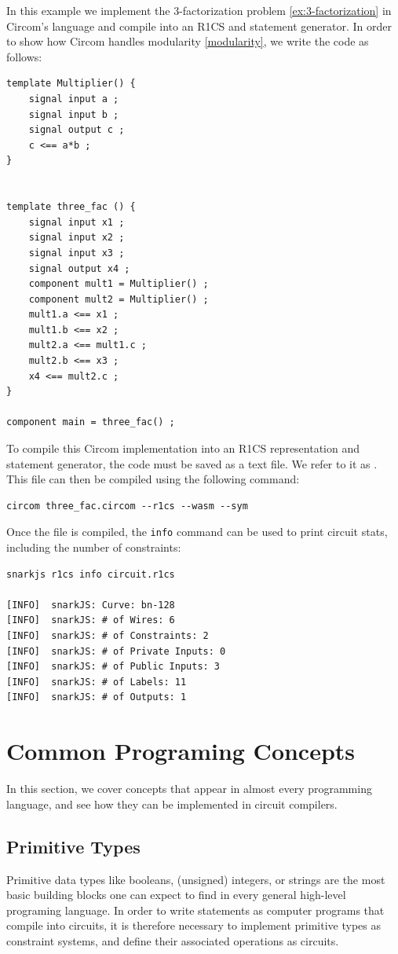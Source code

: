 \begin{example}
\label{ex:3-fac-circom}
In this example we implement the 3-factorization problem \ref{ex:3-factorization} in Circom's language and compile into an R1CS and statement generator. In order to show how Circom handles modularity \ref{modularity}, we write the code as follows:
\begin{lstlisting}
template Multiplier() {
    signal input a ;
    signal input b ;
    signal output c ;
    c <== a*b ;
}


template three_fac () {
    signal input x1 ;
    signal input x2 ;
    signal input x3 ;
    signal output x4 ;
    component mult1 = Multiplier() ;
    component mult2 = Multiplier() ;
    mult1.a <== x1 ;
    mult1.b <== x2 ;
    mult2.a <== mult1.c ;
    mult2.b <== x3 ;
    x4 <== mult2.c ;
}

component main = three_fac() ;
\end{lstlisting}
To compile this Circom implementation into an R1CS representation and statement generator, the code must be saved as a text file. We refer to it as . This file can then be compiled using the following command:
\begin{lstlisting}
circom three_fac.circom --r1cs --wasm --sym
\end{lstlisting}
Once the file is compiled, the \texttt{info} command can be used to print circuit stats, including the number of constraints:
\begin{lstlisting}
snarkjs r1cs info circuit.r1cs

[INFO]  snarkJS: Curve: bn-128
[INFO]  snarkJS: # of Wires: 6
[INFO]  snarkJS: # of Constraints: 2
[INFO]  snarkJS: # of Private Inputs: 0
[INFO]  snarkJS: # of Public Inputs: 3
[INFO]  snarkJS: # of Labels: 11
[INFO]  snarkJS: # of Outputs: 1
\end{lstlisting}
\end{example}

\section{Common Programing Concepts}
In this section, we cover concepts that appear in almost every programming language, and see how they can be implemented in circuit compilers. 
\subsection{Primitive Types} 
Primitive data types like booleans, (unsigned) integers, or strings are the most basic building blocks one can expect to find in every general high-level programing language. In order to write statements as computer programs that compile into circuits, it is therefore necessary to implement primitive types as constraint systems, and define their associated operations as circuits.

